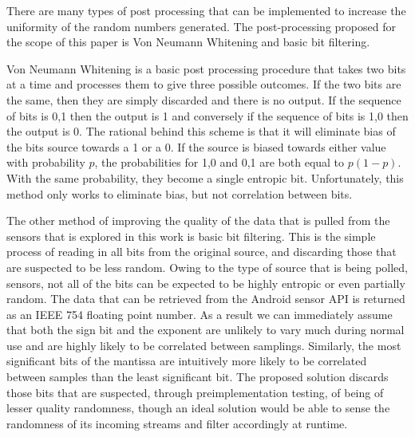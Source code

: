 

There are many types of post processing that can be implemented to increase the
uniformity of the random numbers generated. The post-processing proposed for the
scope of this paper is Von Neumann Whitening \cite{vn_whitening} and basic bit
filtering. 

Von Neumann Whitening is a basic post processing procedure that takes two bits
at a time and processes them to give three possible outcomes. If the two bits
are the same, then they are simply discarded and there is no output. If the
sequence of bits is 0,1 then the output is 1 and conversely if the sequence of
bits is 1,0 then the output is 0. The rational behind this scheme is that it
will eliminate bias of the bits source towards a 1 or a 0. If the source is
biased towards either value with probability $p$, the probabilities for 1,0
and 0,1 are both equal to $p(1-p)$. With the same probability, they become a
single entropic bit. Unfortunately, this method only works to eliminate bias,
but not correlation between bits.

The other method of improving the quality of the data that is pulled from the
sensors that is explored in this work is basic bit filtering. This is the simple
process of reading in all bits from the original source, and discarding those
that are suspected to be less random. Owing to the type of source that is being
polled, sensors, not all of the bits can be expected to be highly entropic or
even partially random. The data that can be retrieved from the Android sensor
API is returned as an IEEE 754 floating point number. As a result we can
immediately assume that both the sign bit and the exponent are unlikely to vary
much during normal use and are highly likely to be correlated between samplings.
Similarly, the most significant bits of the mantissa are intuitively more likely
to be correlated between samples than the least significant bit. The proposed
solution discards those bits that are suspected, through preimplementation
testing, of being of lesser quality randomness, though an ideal solution would
be able to sense the randomness of its incoming streams and filter accordingly
at runtime.
